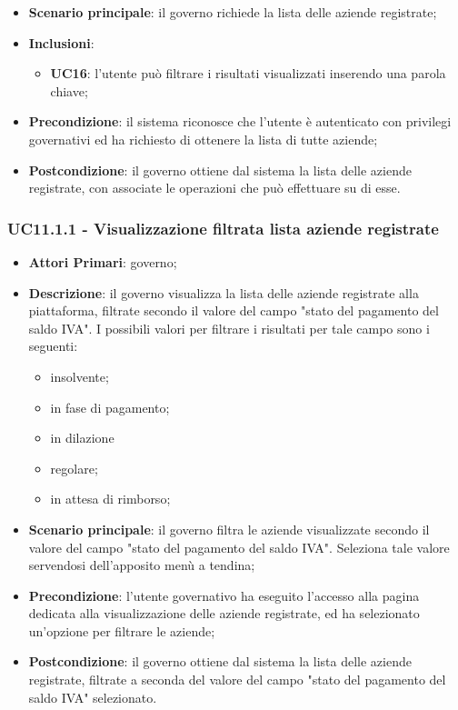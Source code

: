 \begin{itemize}
	\item \textbf{Scenario principale}: il governo richiede la lista delle aziende registrate;
	\item \textbf{Inclusioni}:
	\begin{itemize}
		\item \textbf{UC16}: l'utente può filtrare i risultati visualizzati inserendo una parola chiave;
	\end{itemize}
	\item \textbf{Precondizione}: il sistema riconosce che l'utente è autenticato con privilegi governativi ed ha richiesto di ottenere la lista di tutte aziende;
	\item \textbf{Postcondizione}: il governo ottiene dal sistema la lista delle aziende registrate, con associate le operazioni che può effettuare su di esse.
\end{itemize}

\subsubsection{UC11.1.1 - Visualizzazione filtrata lista aziende registrate}
\begin{itemize}
	\item \textbf{Attori Primari}: governo;
	\item \textbf{Descrizione}: il governo visualizza la lista delle aziende registrate alla piattaforma, filtrate secondo il valore del campo "stato del pagamento del saldo IVA". I possibili valori per filtrare i risultati per tale campo sono i seguenti:
	\begin{itemize}
		\item insolvente;
		\item in fase di pagamento;
		\item in dilazione
		\item regolare;
		\item in attesa di rimborso;
	\end{itemize}
	
	\item \textbf{Scenario principale}: il governo filtra le aziende visualizzate secondo il valore del campo "stato del pagamento del saldo IVA". Seleziona tale valore servendosi dell'apposito menù a tendina;
	\item \textbf{Precondizione}: l'utente governativo ha eseguito l'accesso alla pagina dedicata alla visualizzazione delle aziende registrate, ed ha selezionato un'opzione per filtrare le aziende;
	\item \textbf{Postcondizione}: il governo ottiene dal sistema la lista delle aziende registrate, filtrate a seconda del valore del campo "stato del pagamento del saldo IVA" selezionato.
\end{itemize}


